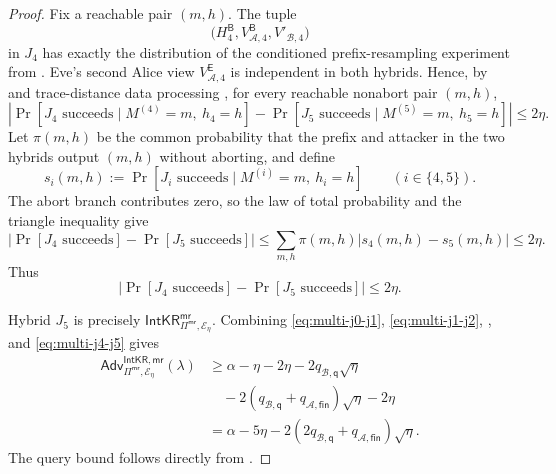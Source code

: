 \documentclass[11pt]{article}
\newcommand{\cA}{\mathcal{A}}
\newcommand{\cB}{\mathcal{B}}
\newcommand{\cE}{\mathcal{E}}
\newcommand{\IntKR}{\mathsf{IntKR}}
\newcommand{\Adv}{\mathsf{Adv}}
\begin{document}
\begin{proof}
Fix a reachable pair \((m,h)\). The tuple
\[
  \bigl(
    H^{\mathsf B}_4,
    V^{\mathsf B}_{\cA,4},
    V'_{\cB,4}
  \bigr)
\]
in \(J_4\) has exactly the distribution of the conditioned prefix-resampling
experiment from . Eve's second Alice view
\(V^{\mathsf E}_{\cA,4}\) is independent in both hybrids. Hence, by
 and trace-distance data processing
\cite[Chapter~3]{Watrous18}, for every reachable nonabort pair \((m,h)\),
\[
  \left|
    \Pr[J_4\text{ succeeds}\mid M^{(4)}=m,\ h_4=h]
    -
    \Pr[J_5\text{ succeeds}\mid M^{(5)}=m,\ h_5=h]
  \right|
  \le 2\eta.
\]
Let \(\pi(m,h)\) be the common probability that the prefix and attacker in
the two hybrids output \((m,h)\) without aborting, and define
\[
  s_i(m,h)
  :=
  \Pr[J_i\text{ succeeds}\mid M^{(i)}=m,\ h_i=h]
  \qquad (i\in\{4,5\}).
\]
The abort branch contributes zero, so the law of total probability and the
triangle inequality give
\[
  \left|
    \Pr[J_4\text{ succeeds}]-\Pr[J_5\text{ succeeds}]
  \right|
  \le
  \sum_{m,h}\pi(m,h)\left|s_4(m,h)-s_5(m,h)\right|
  \le 2\eta.
\]
Thus
\begin{equation}
\label{eq:multi-j4-j5}
  \left|
    \Pr[J_4\text{ succeeds}]-\Pr[J_5\text{ succeeds}]
  \right|
  \le2\eta.
\end{equation}

Hybrid \(J_5\) is precisely
\(\IntKR^{\mathsf{mr}}_{\Pi^{\mathsf{mr}},\cE_\eta}\). Combining
\eqref{eq:multi-j0-j1}, \eqref{eq:multi-j1-j2},
, and
\eqref{eq:multi-j4-j5} gives
\begin{align*}
  \Adv^{\IntKR,\mathsf{mr}}_{
    \Pi^{\mathsf{mr}},\cE_\eta}(\lambda)
  &\ge
  \alpha
  -\eta-2\eta
  -2q_{\cB,\mathsf q}\sqrt\eta
  \\
  &\quad
  -2(q_{\cB,\mathsf q}+q_{\cA,\mathsf{fin}})\sqrt\eta
  -2\eta
  \\
  &=
  \alpha
  -5\eta
  -2(2q_{\cB,\mathsf q}+q_{\cA,\mathsf{fin}})\sqrt\eta.
\end{align*}
The query bound follows directly from
.
\end{proof}
\end{document}

